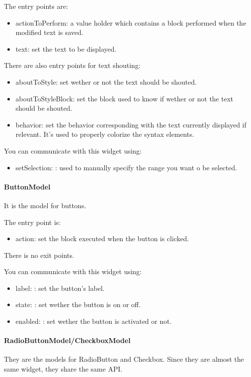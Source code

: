\documentclass[a4paper,10pt,twoside]{book}
\begin{document}
The entry points are:
\begin{itemize}
	\item actionToPerform: a value holder which contains a block performed when the modified text is saved.
	\item text: set the text to be displayed.
\end{itemize}
There are also entry points for text shouting:
\begin{itemize}	
	\item aboutToStyle: set wether or not the text should be shouted.
	\item aboutToStyleBlock: set the block used to know if wether or not the text should be shouted.
	\item behavior: set the behavior corresponding with the text currently displayed if relevant. It's used to properly colorize the syntax elements.
\end{itemize}	
You can communicate with this widget using:
\begin{itemize}	
	\item setSelection: : used to manually specify the range you want o be selected.
\end{itemize}

\paragraph{ButtonModel} It is the model for buttons.

The entry point is:
\begin{itemize}
	\item action: set the block executed when the button is clicked.
\end{itemize}	
There is no exit points.	

You can communicate with this widget using:
\begin{itemize}		
	\item label: : set the button's label.
	\item state: : set wether the button is on or off.
	\item enabled: : set wether the button is activated or not.
\end{itemize}

\paragraph{RadioButtonModel/CheckboxModel} They are the models for RadioButton and Checkbox. Since they are almost the same widget, they share the same API.
\end{document}
